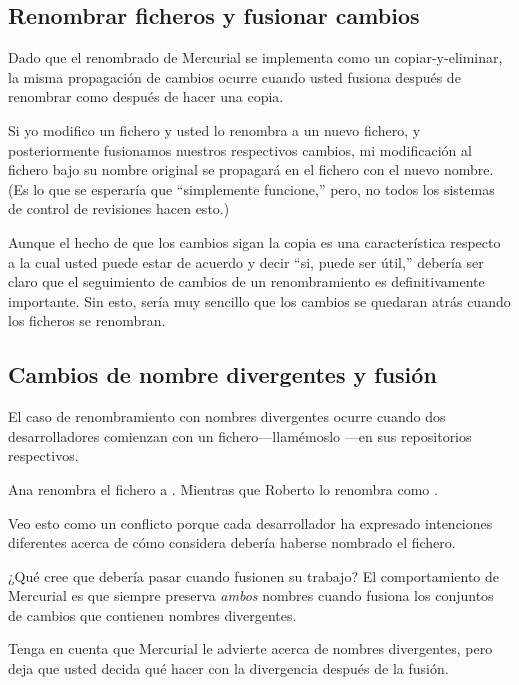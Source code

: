 \subsection{Renombrar ficheros y fusionar cambios}

Dado que el renombrado de Mercurial se implementa como un
copiar-y-eliminar, la misma propagación de cambios ocurre cuando usted
fusiona después de renombrar como después de hacer una copia.

Si yo modifico un fichero y usted lo renombra a un nuevo fichero, y
posteriormente fusionamos nuestros respectivos cambios, mi
modificación al fichero bajo su nombre original se propagará en el
fichero con el nuevo nombre. (Es lo que se esperaría que ``simplemente
funcione,''
pero, no todos los sistemas de control de revisiones hacen esto.)

Aunque el hecho de que los cambios sigan la copia es una característica
respecto a la cual usted puede estar de acuerdo y decir ``si, puede
ser útil,'' debería ser claro
que el seguimiento de cambios de un renombramiento es definitivamente
importante.  Sin esto, sería muy sencillo que los cambios se
quedaran atrás cuando los ficheros se renombran.

\subsection{Cambios de nombre divergentes y fusión}

El caso de renombramiento con nombres divergentes ocurre cuando dos
desarrolladores comienzan  con un fichero---llamémoslo
---en sus repositorios respectivos.

Ana renombra el fichero a .
Mientras que Roberto lo renombra como .

Veo esto como un conflicto porque cada desarrollador ha expresado
intenciones diferentes acerca de cómo considera debería haberse
nombrado el fichero.

¿Qué cree que debería pasar cuando fusionen su trabajo?
El comportamiento de Mercurial es que siempre preserva \emph{ambos}
nombres cuando fusiona  los conjuntos de cambios que contienen nombres
divergentes.

Tenga en cuenta que Mercurial le advierte acerca de nombres
divergentes, pero deja que usted decida qué hacer con la divergencia
después de la fusión.

